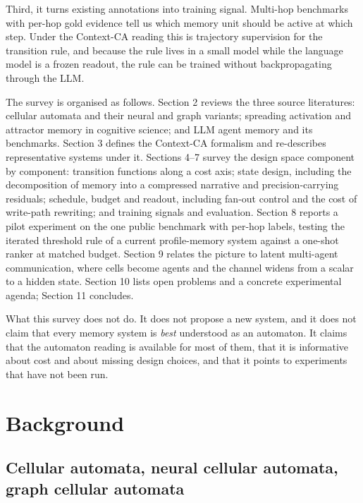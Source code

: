 \documentclass[11pt]{article}
\begin{document}
Third, it turns existing annotations into training signal. Multi-hop benchmarks with per-hop gold evidence \cite{prograph,hotpotqa,musique} tell us which memory unit should be active at which step. Under the Context-CA reading this is trajectory supervision for the transition rule, and because the rule lives in a small model while the language model is a frozen readout, the rule can be trained without backpropagating through the LLM.

The survey is organised as follows. Section 2 reviews the three source literatures: cellular automata and their neural and graph variants; spreading activation and attractor memory in cognitive science; and LLM agent memory and its benchmarks. Section 3 defines the Context-CA formalism and re-describes representative systems under it. Sections 4--7 survey the design space component by component: transition functions along a cost axis; state design, including the decomposition of memory into a compressed narrative and precision-carrying residuals; schedule, budget and readout, including fan-out control and the cost of write-path rewriting; and training signals and evaluation. Section 8 reports a pilot experiment on the one public benchmark with per-hop labels, testing the iterated threshold rule of a current profile-memory system against a one-shot ranker at matched budget. Section 9 relates the picture to latent multi-agent communication, where cells become agents and the channel widens from a scalar to a hidden state. Section 10 lists open problems and a concrete experimental agenda; Section 11 concludes.

What this survey does not do. It does not propose a new system, and it does not claim that every memory system is \emph{best} understood as an automaton. It claims that the automaton reading is available for most of them, that it is informative about cost and about missing design choices, and that it points to experiments that have not been run.

\section{Background}

\subsection{Cellular automata, neural cellular automata, graph cellular automata}
\end{document}
